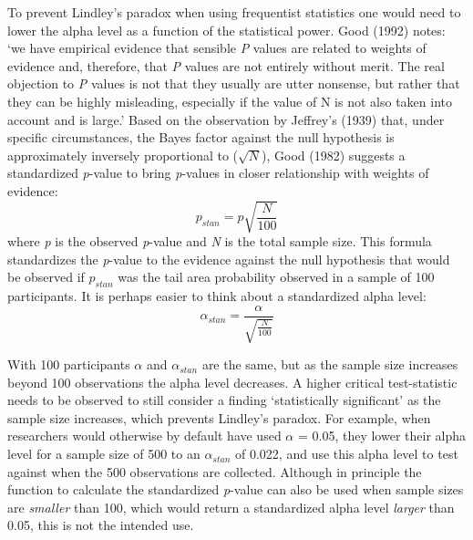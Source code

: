 \documentclass[
  english,
  ,jou,floatsintext]{apa6}
\begin{document}
To prevent Lindley's paradox when using frequentist statistics one would need to lower the alpha level as a function of the statistical power. Good (1992) notes: `we have empirical evidence that sensible \emph{P} values are related to weights of evidence and, therefore, that \emph{P} values are not entirely without merit. The real objection to \emph{P} values is not that they usually are utter nonsense, but rather that they can be highly misleading, especially if the value of N is not also taken into account and is large.' Based on the observation by Jeffrey's (1939) that, under specific circumstances, the Bayes factor against the null hypothesis is approximately inversely proportional to (\(\sqrt{N}\)), Good (1982) suggests a standardized \emph{p}-value to bring \emph{p}-values in closer relationship with weights of evidence:
\begin{equation}
p_{stan} = p\sqrt{\frac{N}{100}} 
\label{eq:pstan}
\end{equation}
where \emph{p} is the observed \emph{p}-value and \emph{N} is the total sample size. This formula standardizes the \emph{p}-value to the evidence against the null hypothesis that would be observed if \(p_{stan}\) was the tail area probability observed in a sample of 100 participants. It is perhaps easier to think about a standardized alpha level:
\begin{equation}
\alpha_{stan} = \frac{\alpha}{\sqrt{\frac{N}{100}}} \label{eq:astan}
\end{equation}

With 100 participants \(\alpha\) and \(\alpha_{stan}\) are the same, but as the sample size increases beyond 100 observations the alpha level decreases. A higher critical test-statistic needs to be observed to still consider a finding `statistically significant' as the sample size increases, which prevents Lindley's paradox. For example, when researchers would otherwise by default have used \(\alpha\) = 0.05, they lower their alpha level for a sample size of 500 to an \(\alpha_{stan}\) of 0.022, and use this alpha level to test against when the 500 observations are collected. Although in principle the function to calculate the standardized \emph{p}-value can also be used when sample sizes are \emph{smaller} than 100, which would return a standardized alpha level \emph{larger} than 0.05, this is not the intended use.
\end{document}
